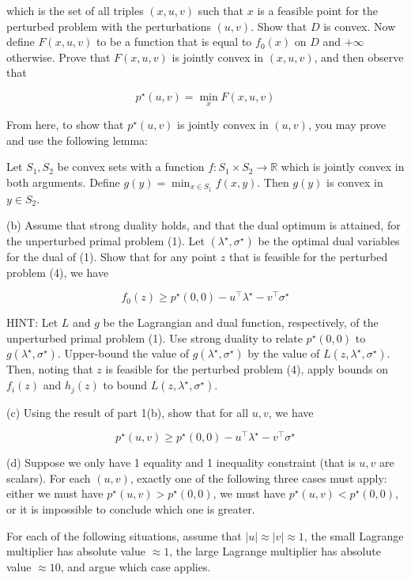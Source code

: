 \documentclass[
	12pt,
]{fphw}
\begin{document}
which is the set of all triples \((x,u,v)\) such that \(x\) is a feasible point for the perturbed problem with the perturbations \((u,v)\).
Show that \(D\) is convex. Now define \(F(x,u,v)\) to be a function that is equal to \(f_0(x)\) on \(D\) and \(+\infty\) otherwise. Prove that \(F(x,u,v)\) is jointly convex in \((x,u,v)\), and then observe that

\[
p^\star(u,v) = \min_x F(x,u,v)
\tag{8}
\]

From here, to show that \(p^\star(u,v)\) is jointly convex in \((u,v)\), you may prove and use the following lemma:

Let \(S_1, S_2\) be convex sets with a function \(f : S_1 \times S_2 \to \mathbb{R}\) which is jointly convex in both arguments.
Define \(g(y) = \min_{x \in S_1} f(x,y)\).
Then \(g(y)\) is convex in \(y \in S_2\).

(b) Assume that strong duality holds, and that the dual optimum is attained, for the unperturbed primal problem (1).
Let \((\lambda^\star, \sigma^\star)\) be the optimal dual variables for the dual of (1).
Show that for any point \(z\) that is feasible for the perturbed problem (4), we have

\[
f_0(z) \ge p^\star(0,0) - u^\top \lambda^\star - v^\top \sigma^\star
\tag{9}
\]

HINT: Let \(L\) and \(g\) be the Lagrangian and dual function, respectively, of the unperturbed primal problem (1).
Use strong duality to relate \(p^\star(0,0)\) to \(g(\lambda^\star, \sigma^\star)\).
Upper-bound the value of \(g(\lambda^\star, \sigma^\star)\) by the value of \(L(z,\lambda^\star,\sigma^\star)\).
Then, noting that \(z\) is feasible for the perturbed problem (4), apply bounds on \(f_i(z)\) and \(h_j(z)\) to bound \(L(z,\lambda^\star,\sigma^\star)\).

(c) Using the result of part 1(b), show that for all \(u,v\), we have

\[
p^\star(u,v) \ge p^\star(0,0) - u^\top \lambda^\star - v^\top \sigma^\star
\tag{10}
\]

(d) Suppose we only have 1 equality and 1 inequality constraint (that is \(u,v\) are scalars).
For each \((u,v)\), exactly one of the following three cases must apply:
either we must have \(p^\star(u,v) > p^\star(0,0)\),
we must have \(p^\star(u,v) < p^\star(0,0)\),
or it is impossible to conclude which one is greater.

For each of the following situations, assume that \(|u| \approx |v| \approx 1\),
the small Lagrange multiplier has absolute value \(\approx 1\),
the large Lagrange multiplier has absolute value \(\approx 10\),
and argue which case applies.
\end{document}
